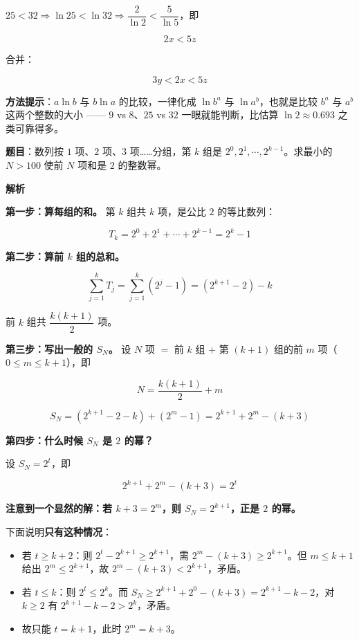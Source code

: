 $25<32\Rightarrow\ln25<\ln32\Rightarrow\dfrac2{\ln2}<\dfrac5{\ln5}$，即

\[2x<5z\]

合并：

\[3y<2x<5z\]


\begin{gktip}
\textbf{方法提示}：$a\ln b$ 与 $b\ln a$ 的比较，一律化成 $\ln b^{a}$ 与 $\ln a^{b}$，也就是比较 $b^{a}$ 与 $a^{b}$ 这两个整数的大小 —— $9$ vs $8$、$25$ vs $32$ 一眼就能判断，比估算 $\ln2\approx0.693$ 之类可靠得多。
\end{gktip}

\par\medskip


\textbf{题目}：数列按 $1$ 项、$2$ 项、$3$ 项……分组，第 $k$ 组是 $2^{0},2^{1},\cdots,2^{k-1}$。求最小的 $N>100$ 使前 $N$ 项和是 $2$ 的整数幂。

\textbf{解析}

\textbf{第一步：算每组的和。} 第 $k$ 组共 $k$ 项，是公比 $2$ 的等比数列：

\[T_k=2^{0}+2^{1}+\cdots+2^{k-1}=2^{k}-1\]

\textbf{第二步：算前 $k$ 组的总和。}

\[\sum_{j=1}^{k}T_j=\sum_{j=1}^{k}\left(2^{j}-1\right)=\left(2^{k+1}-2\right)-k\]

前 $k$ 组共 $\dfrac{k(k+1)}2$ 项。

\textbf{第三步：写出一般的 $S_N$。} 设 $N$ 项 $=$ 前 $k$ 组 $+$ 第 $(k+1)$ 组的前 $m$ 项（$0\le m\le k+1$），即

\[N=\frac{k(k+1)}2+m\]

\[S_N=\left(2^{k+1}-2-k\right)+\left(2^{m}-1\right)=2^{k+1}+2^{m}-(k+3)\]

\textbf{第四步：什么时候 $S_N$ 是 $2$ 的幂？}

设 $S_N=2^{t}$，即

\[2^{k+1}+2^{m}-(k+3)=2^{t}\]

\textbf{注意到一个显然的解：若 $k+3=2^{m}$，则 $S_N=2^{k+1}$，正是 $2$ 的幂。}

下面说明\textbf{只有这种情况}：

\begin{itemize}
\item 若 $t\ge k+2$：则 $2^{t}-2^{k+1}\ge2^{k+1}$，需 $2^{m}-(k+3)\ge2^{k+1}$。但 $m\le k+1$ 给出 $2^{m}\le2^{k+1}$，故 $2^{m}-(k+3)<2^{k+1}$，矛盾。
\item 若 $t\le k$：则 $2^{t}\le2^{k}$。而 $S_N\ge2^{k+1}+2^{0}-(k+3)=2^{k+1}-k-2$，对 $k\ge2$ 有 $2^{k+1}-k-2>2^{k}$，矛盾。
\item 故只能 $t=k+1$，此时 $2^{m}=k+3$。
\end{itemize}

